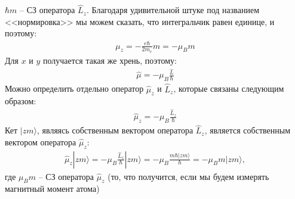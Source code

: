 \documentclass[__main__.tex]{subfiles}
\begin{document}
$\hbar m$ -- СЗ оператора $\hat{L}_z$. Благодаря удивительной штуке под названием <<нормировка>> мы можем сказать, что интегральчик равен единице, и поэтому:
\begin{gather*}
\mu_z=-\frac{e\hbar }{2m_e}m=-\mu_B m
\end{gather*}
Для $x$ и $y$ получается такая же хрень, поэтому:
\begin{gather*}
\hat{\mu}=-\mu_B\frac{\hat{L}}{\hbar}
\end{gather*}
Можно определить отдельно оператор $\hat{\mu}_z$ и $\hat{L}_z$, которые связаны следующим образом:
\begin{gather*}
\hat{\mu}_z=-\mu_B\frac{\hat{L}_z}{\hbar}
\end{gather*}
Кет $|zm\rangle$, являясь собственным вектором оператора $\hat{L}_z$, является собственным вектором оператора $\hat{\mu}_z$:
\begin{gather*}
\hat{\mu}_z |zm\rangle = -\mu_B \frac{\hat{L}_z}{\hbar}|zm\rangle=-\mu_B \frac{m\hbar |zm\rangle}{\hbar}=-\mu_B m |zm\rangle,
\end{gather*}
где $\mu_B m$ -- СЗ оператора $\hat{\mu}_z$ (то, что получится, если мы будем измерять магнитный момент атома)
\end{document}
